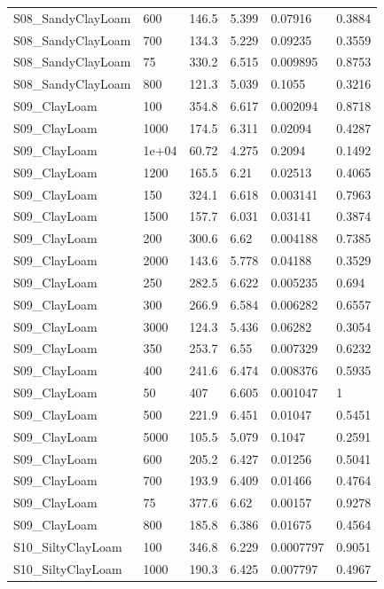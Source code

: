{\begin{longtable}
{}S08\_SandyClayLoam & 600 & 146.5 & 5.399 & 0.07916 & 0.3884\\
{}S08\_SandyClayLoam & 700 & 134.3 & 5.229 & 0.09235 & 0.3559\\
{}S08\_SandyClayLoam & 75 & 330.2 & 6.515 & 0.009895 & 0.8753\\
{}S08\_SandyClayLoam & 800 & 121.3 & 5.039 & 0.1055 & 0.3216\\
{}S09\_ClayLoam & 100 & 354.8 & 6.617 & 0.002094 & 0.8718\\
{}S09\_ClayLoam & 1000 & 174.5 & 6.311 & 0.02094 & 0.4287\\
{}S09\_ClayLoam & 1e+04 & 60.72 & 4.275 & 0.2094 & 0.1492\\
{}S09\_ClayLoam & 1200 & 165.5 & 6.21 & 0.02513 & 0.4065\\
{}S09\_ClayLoam & 150 & 324.1 & 6.618 & 0.003141 & 0.7963\\
{}S09\_ClayLoam & 1500 & 157.7 & 6.031 & 0.03141 & 0.3874\\
{}S09\_ClayLoam & 200 & 300.6 & 6.62 & 0.004188 & 0.7385\\
{}S09\_ClayLoam & 2000 & 143.6 & 5.778 & 0.04188 & 0.3529\\
{}S09\_ClayLoam & 250 & 282.5 & 6.622 & 0.005235 & 0.694\\
{}S09\_ClayLoam & 300 & 266.9 & 6.584 & 0.006282 & 0.6557\\
{}S09\_ClayLoam & 3000 & 124.3 & 5.436 & 0.06282 & 0.3054\\
{}S09\_ClayLoam & 350 & 253.7 & 6.55 & 0.007329 & 0.6232\\
{}S09\_ClayLoam & 400 & 241.6 & 6.474 & 0.008376 & 0.5935\\
{}S09\_ClayLoam & 50 & 407 & 6.605 & 0.001047 & 1\\
{}S09\_ClayLoam & 500 & 221.9 & 6.451 & 0.01047 & 0.5451\\
{}S09\_ClayLoam & 5000 & 105.5 & 5.079 & 0.1047 & 0.2591\\
{}S09\_ClayLoam & 600 & 205.2 & 6.427 & 0.01256 & 0.5041\\
{}S09\_ClayLoam & 700 & 193.9 & 6.409 & 0.01466 & 0.4764\\
{}S09\_ClayLoam & 75 & 377.6 & 6.62 & 0.00157 & 0.9278\\
{}S09\_ClayLoam & 800 & 185.8 & 6.386 & 0.01675 & 0.4564\\
{}S10\_SiltyClayLoam & 100 & 346.8 & 6.229 & 0.0007797 & 0.9051\\
{}S10\_SiltyClayLoam & 1000 & 190.3 & 6.425 & 0.007797 & 0.4967\\

\end{longtable}}
